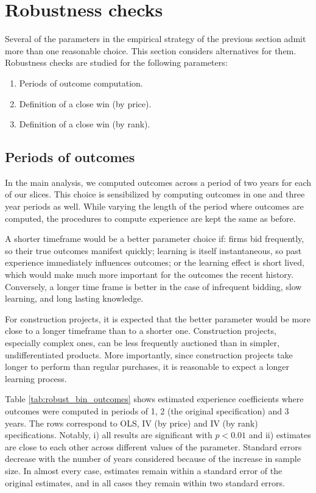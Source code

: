%


\section{Robustness checks}
Several of the parameters in the empirical strategy of the previous section admit more than one reasonable choice. This section considers alternatives for them. Robustness checks are studied for the following parameters:
\begin{enumerate}
  \item Periods of outcome computation.
  \item Definition of a close win (by price).
  \item Definition of a close win (by rank).
\end{enumerate}
\subsection{Periods of outcomes}
In the main analysis, we computed outcomes across a period of two years for each of our slices. This choice is sensibilized by computing outcomes in one and three year periods as well. While varying the length of the period where outcomes are computed, the procedures to compute experience are kept the same as before.

A shorter timeframe would be a better parameter choice if: firms bid frequently, so their true outcomes manifest quickly;  learning is itself instantaneous,  so past experience immediately influences outcomes; or  the learning effect is short lived, which would make much more important for the outcomes the recent history. Conversely, a longer time frame is better in the case of infrequent bidding, slow learning, and long lasting knowledge.

For construction projects, it is expected that the better parameter would be more close to a longer timeframe than to a shorter one. Construction projects, especially complex ones, can be less frequently auctioned than in simpler, undifferentiated products. More importantly, since construction projects take longer to perform than regular purchases, it is reasonable to expect a longer learning process.

Table \ref{tab:robust_bin_outcomes} shows estimated experience coefficients where outcomes were computed in periods of 1, 2 (the original specification) and 3 years. The rows correspond to OLS, IV (by price) and IV (by rank) specifications. Notably, i) all results are significant with $p<0.01$ and ii) estimates are close to each other across different values of the parameter. Standard errors decrease with the number of years considered because of the increase in sample size. In almost every case, estimates remain within a standard error of the original estimates, and in all cases they remain within two standard errors.


